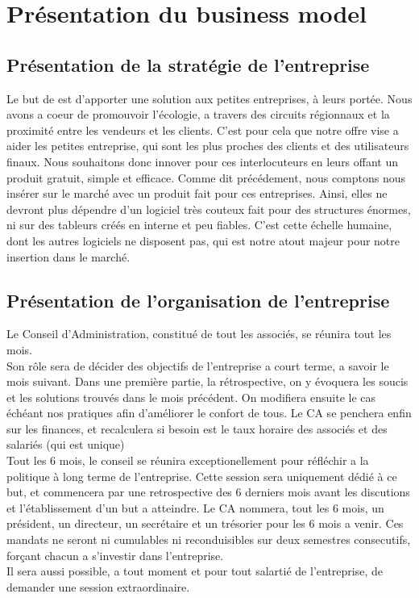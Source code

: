 	\chapter{Présentation du business model}
		\section{Présentation de la stratégie de l'entreprise}
			Le but de \K{} est d'apporter une solution aux petites entreprises, à leurs portée.
			Nous avons a coeur de promouvoir l'écologie, a travers des circuits régionnaux et la proximité entre les vendeurs et les clients.
			C'est pour cela que notre offre vise a aider les petites entreprise, qui sont les plus proches des clients et des utilisateurs finaux.
			Nous souhaitons donc innover pour ces interlocuteurs en leurs offant un produit gratuit, simple et efficace.
			Comme dit précédement, nous comptons nous insérer sur le marché avec un produit fait pour ces entreprises.
			Ainsi, elles ne devront plus dépendre d'un logiciel très couteux fait pour des structures énormes,
			ni sur des tableurs créés en interne et peu fiables.
			C'est cette échelle humaine, dont les autres logiciels ne disposent pas, qui est notre atout majeur pour notre insertion dans le marché.
			
		\section{Présentation de l'organisation de l'entreprise}
			Le Conseil d'Administration, constitué de tout les associés, se réunira tout les mois.\\
			Son rôle sera de décider des objectifs de l'entreprise a court terme, a savoir le mois suivant.
			Dans une première partie, la rétrospective, 
			on y évoquera les soucis et les solutions trouvés dans le mois précédent. On modifiera ensuite le cas échéant nos pratiques afin
			d'améliorer le confort de tous.
			Le CA se penchera enfin sur les finances, et recalculera si besoin est le taux horaire des associés et des salariés (qui est unique)\\
			Tout les 6 mois, le conseil se réunira exceptionellement pour réfléchir a la politique à long terme de l'entreprise.
			Cette session sera uniquement dédié à ce but, et commencera par une retrospective des 6 derniers mois
			avant les discutions et l'établissement d'un but a atteindre.
			Le CA nommera, tout les 6 mois, un président, un directeur, un secrétaire et un trésorier pour les 6 mois a venir.
			Ces mandats ne seront ni cumulables ni reconduisibles sur deux semestres consecutifs, forçant chacun a s'investir dans l'entreprise. \\
			Il sera aussi possible, a tout moment et pour tout salartié de l'entreprise, de demander une session extraordinaire.

